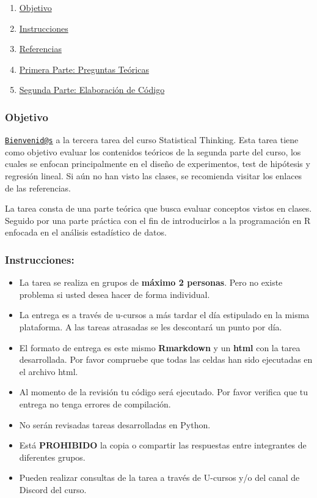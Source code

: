 \documentclass[]{article}
\providecommand{\tightlist}{%
  \setlength{\itemsep}{0pt}\setlength{\parskip}{0pt}}
\begin{document}
\begin{enumerate}
\def\labelenumi{\arabic{enumi}.}
\tightlist
\item
  \protect\hyperlink{id1}{Objetivo}
\item
  \protect\hyperlink{id2}{Instrucciones}
\item
  \protect\hyperlink{id3}{Referencias}
\item
  \protect\hyperlink{id4}{Primera Parte: Preguntas Teóricas}
\item
  \protect\hyperlink{id5}{Segunda Parte: Elaboración de Código}
\end{enumerate}

\hypertarget{objetivo}{%
\subsubsection{\texorpdfstring{\textbf{Objetivo}}{Objetivo}}\label{objetivo}}

\href{mailto:Bienvenid@s}{\nolinkurl{Bienvenid@s}} a la tercera tarea
del curso Statistical Thinking. Esta tarea tiene como objetivo evaluar
los contenidos teóricos de la segunda parte del curso, los cuales se
enfocan principalmente en el diseño de experimentos, test de hipótesis y
regresión lineal. Si aún no han visto las clases, se recomienda visitar
los enlaces de las referencias.

La tarea consta de una parte teórica que busca evaluar conceptos vistos
en clases. Seguido por una parte práctica con el fin de introducirlos a
la programación en R enfocada en el análisis estadístico de datos.

\hypertarget{instrucciones}{%
\subsubsection{\texorpdfstring{\textbf{Instrucciones:}}{Instrucciones:}}\label{instrucciones}}

\begin{itemize}
\tightlist
\item
  La tarea se realiza en grupos de \textbf{máximo 2 personas}. Pero no
  existe problema si usted desea hacer de forma individual.
\item
  La entrega es a través de u-cursos a más tardar el día estipulado en
  la misma plataforma. A las tareas atrasadas se les descontará un punto
  por día.
\item
  El formato de entrega es este mismo \textbf{Rmarkdown} y un
  \textbf{html} con la tarea desarrollada. Por favor compruebe que todas
  las celdas han sido ejecutadas en el archivo html.
\item
  Al momento de la revisión tu código será ejecutado. Por favor verifica
  que tu entrega no tenga errores de compilación.
\item
  No serán revisadas tareas desarrolladas en Python.
\item
  Está \textbf{PROHIBIDO} la copia o compartir las respuestas entre
  integrantes de diferentes grupos.
\item
  Pueden realizar consultas de la tarea a través de U-cursos y/o del
  canal de Discord del curso.
\end{itemize}
\end{document}

